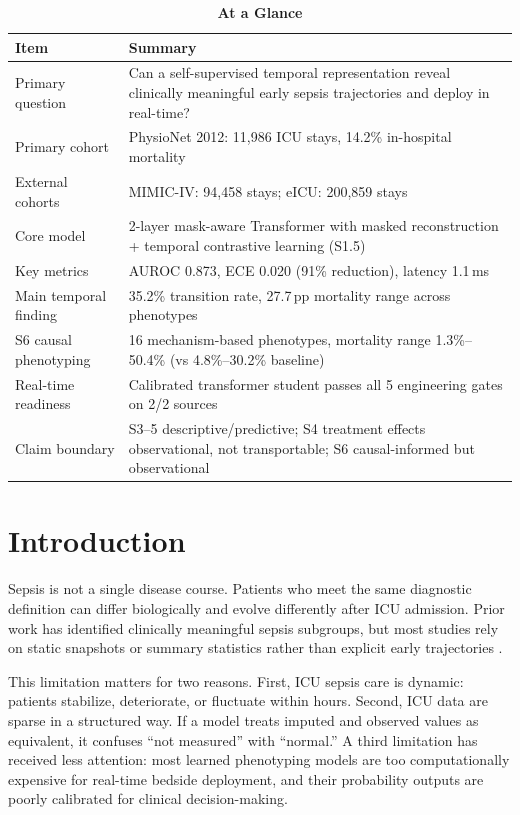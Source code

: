 \documentclass[conference,a4paper]{IEEEtran}
\begin{document}
\begin{table}[t]
\centering
\caption*{\textbf{At a Glance}}
\small
\begin{tabularx}{\textwidth}{lX}
\toprule
\textbf{Item} & \textbf{Summary} \\
\midrule
Primary question & Can a self-supervised temporal representation reveal clinically meaningful early sepsis trajectories and deploy in real-time? \\
Primary cohort & PhysioNet 2012: 11,986 ICU stays, 14.2\% in-hospital mortality \\
External cohorts & MIMIC-IV: 94,458 stays; eICU: 200,859 stays \\
Core model & 2-layer mask-aware Transformer with masked reconstruction + temporal contrastive learning (S1.5) \\
Key metrics & AUROC 0.873, ECE 0.020 (91\% reduction), latency 1.1\,ms \\
Main temporal finding & 35.2\% transition rate, 27.7\,pp mortality range across phenotypes \\
S6 causal phenotyping & 16 mechanism-based phenotypes, mortality range 1.3\%--50.4\% (vs 4.8\%--30.2\% baseline) \\
Real-time readiness & Calibrated transformer student passes all 5 engineering gates on 2/2 sources \\
Claim boundary & S3--5 descriptive/predictive; S4 treatment effects observational, not transportable; S6 causal-informed but observational \\
\bottomrule
\end{tabularx}
\end{table}

\section{Introduction}

Sepsis is not a single disease course. Patients who meet the same diagnostic definition can differ biologically and evolve differently after ICU admission. Prior work has identified clinically meaningful sepsis subgroups, but most studies rely on static snapshots or summary statistics rather than explicit early trajectories \cite{rudd2020,singer2016,seymour2019}.

This limitation matters for two reasons. First, ICU sepsis care is dynamic: patients stabilize, deteriorate, or fluctuate within hours. Second, ICU data are sparse in a structured way. If a model treats imputed and observed values as equivalent, it confuses ``not measured'' with ``normal.'' A third limitation has received less attention: most learned phenotyping models are too computationally expensive for real-time bedside deployment, and their probability outputs are poorly calibrated for clinical decision-making.
\end{document}
